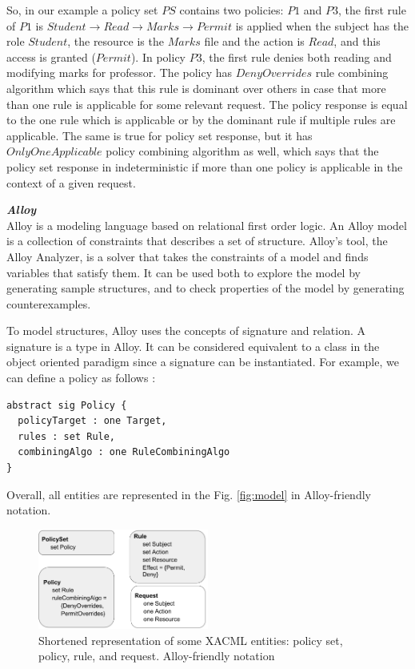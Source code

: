 \documentclass{acm_proc_article-sp}
\begin{document}
So, in our example a policy set $PS$ contains two policies: $P1$ and $P3$, the first rule of $P1$ is $Student \to Read \to Marks \to Permit $ is applied when the subject has the role $Student$, the resource is the $Marks$ file and the action is $Read$, and this access is granted ($Permit$). In policy $P3$, the first rule denies both reading and modifying marks for professor. The policy has $DenyOverrides$ rule combining algorithm which says that this rule is dominant over others in case that more than one rule is applicable for some relevant request. The policy response is equal to the one rule which is applicable or by the dominant rule if multiple rules are applicable. The same is true for policy set response, but it has $OnlyOneApplicable$ policy combining algorithm as well, which says that the policy set response in indeterministic if more than one policy is applicable in the context of a given request.

\textbf{\emph{Alloy}}\\
Alloy \cite{jackson:alloy} is a modeling language based on relational first order logic. An Alloy model is a collection of constraints that describes a set of structure. Alloy's tool, the Alloy Analyzer, is a solver that takes the constraints of a model and finds variables that satisfy them. It can be used both to explore the model by generating sample structures, and to check properties of the model by generating counterexamples. 

To model structures, Alloy uses the concepts of signature and relation. A signature is a type in Alloy. It can be considered equivalent to a class in the object oriented paradigm since a signature can be instantiated. For example, we can define a policy as follows \cite{acp:alloy}:
 
 \begin{verbatim}
abstract sig Policy {
  policyTarget : one Target,
  rules : set Rule,
  combiningAlgo : one RuleCombiningAlgo
} 
\end{verbatim}

Overall, all entities are represented in the Fig. \ref{fig:model} in Alloy-friendly notation.
\begin{figure}[h]
\includegraphics[width=0.5\textwidth]{model.png}
\caption{Shortened representation of some XACML entities: policy set, policy, rule, and request. Alloy-friendly notation}    
  \label{fig:tree}
\end{figure}
\end{document}
